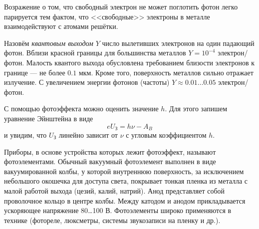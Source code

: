 Возражение о том, что свободный электрон не может поглотить фотон легко
парируется тем фактом, что <<свободные>> электроны в металле взаимодействуют с
атомами решётки.

Назовём \emph{квантовым выходом} $ Y $ число вылетивших электронов на один
падающий фотон. Вблизи красной границы для большинства металлов $ Y = 10^{-4} $
электрон/фотон. Малость квантого выхода обусловлена требованием близости
электронов к границе --- не более $ 0.1 $ мкм. Кроме того, поверхность металлов
сильно отражает излучение. С увеличением энергии фотонов (частоты) $ Y \approx
0.01 \ldots 0.05 $ электрон/фотон. 

С помощью фотоэффекта можно оценить значение $ h $. Для этого запишем уравнение Эйнштейна
в виде 
\[
  eU_{\text{З}} = h\nu - A_B
\]
и увидим, что $ U_{\text{З}} $ линейно зависит от $ \nu $ с угловым
коэффициентом $ h $.

Приборы, в основе устройства которых лежит фотоэффект, 
называют фотоэлементами. Обычный вакуумный фотоэлемент 
выполнен в виде вакуумированной колбы, у которой внутреннюю
поверхность, за исключением небольшого окошечка для доступа
света, покрывает тонкая пленка из металла с малой работой 
выхода (цезий, калий, натрий). Анод представляет собой проволочное
кольцо в центре колбы. Между катодом и анодом прикладывается
ускоряющее напряжение 80\ldots100 В. Фотоэлементы широко 
применяются в технике (фотореле, люксметры, системы звукозаписи
на пленку и др.).
